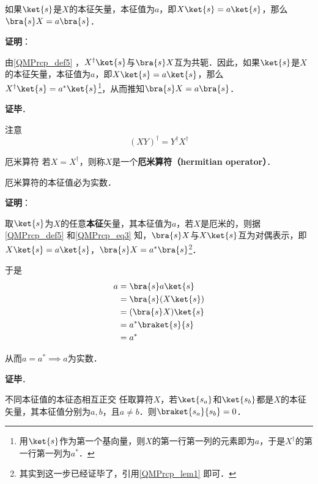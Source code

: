\begin{lemma}{}\label{QMPrcp_lem1}
如果$\ket{s}$是$X$的本征矢量，本征值为$a$，即$X\ket{s}=a\ket{s}$，那么$\bra{s}X=a\bra{s}$．
\end{lemma}

\textbf{证明}：

由\autoref{QMPrcp_def5} ，$X^\dagger\ket{s}$与$\bra{s}X$互为共轭．因此，如果$\ket{s}$是$X$的本征矢量，本征值为$a$，即$X\ket{s}=a\ket{s}$，那么$X^\dagger\ket{s}=a^*\ket{s}$\footnote{用$\ket{s}$作为第一个基向量，则$X$的第一行第一列的元素即为$a$，于是$X^\dagger$的第一行第一列为$a^*$．}，从而推知$\bra{s}X=a\bra{s}$．

\textbf{证毕}．




注意
\begin{equation}
(XY)^\dagger = Y^\dagger X^\dagger
\end{equation}


\begin{definition}{厄米算符}\label{QMPrcp_def12}
若$X=X^\dagger$，则称$X$是一个\textbf{厄米算符（hermitian operator）}．
\end{definition}

\begin{theorem}{}\label{QMPrcp_the2}
厄米算符的本征值必为实数．
\end{theorem}

\textbf{证明}：

取$\ket{s}$为$X$的任意\textbf{本征}矢量，其本征值为$a$，若$X$是厄米的，则据\autoref{QMPrcp_def5} 和\autoref{QMPrcp_eq3} 知，$\bra{s}X$与$X\ket{s}$互为对偶表示，即$X\ket{s}=a\ket{s}$，$\bra{s}X=a^*\bra{s}$\footnote{其实到这一步已经证毕了，引用\autoref{QMPrcp_lem1} 即可．}．

于是
\begin{equation}\label{QMPrcp_eq5}
\begin{aligned}
a&=\bra{s}a\ket{s}\\
&=\bra{s}(X\ket{s})\\
&=(\bra{s}X)\ket{s}\\
&=a^*\braket{s}{s}\\
&=a^*
\end{aligned}
\end{equation}

从而$a=a^*\implies a$为实数．

\textbf{证毕}．


\begin{theorem}{不同本征值的本征态相互正交}\label{QMPrcp_the3}
任取算符$X$，若$\ket{s_a}$和$\ket{s_b}$都是$X$的本征矢量，其本征值分别为$a,b$，且$a\neq b$．则$\braket{s_a}{s_b}=0$．
\end{theorem}

